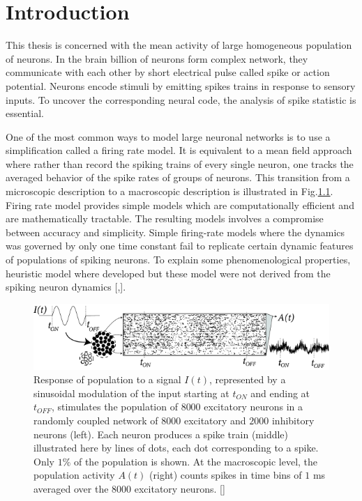\documentclass[12pt,twoside]{report}
\begin{document}
\chapter{Introduction}
\setcounter{page}{1}

\label{sec:intro}


This thesis is concerned with the mean activity of large homogeneous population of neurons. In the brain billion of neurons form complex network, they communicate with each other by short electrical pulse called spike or action potential. Neurons encode stimuli by emitting spikes trains in response to sensory inputs. To uncover the corresponding neural code, the analysis of spike statistic is essential. 


One of the most common ways to model large neuronal networks is to use a simplification called a firing rate model. It is equivalent to a mean field approach where rather than record the spiking trains of every single neuron, one tracks the averaged behavior of the spike rates of groups of neurons. This transition from a microscopic description to a macroscopic description is illustrated in Fig.\ref{fig:x285}. Firing rate model provides simple models which are computationally efficient and are mathematically tractable. The resulting models involves a compromise between accuracy and simplicity. Simple firing-rate models where the dynamics was governed by only one time constant fail to replicate certain dynamic features of populations of spiking neurons. To explain some phenomenological properties, heuristic model where developed but these model were not derived from the spiking neuron dynamics [\cite{WilCow72},\cite{OstBru11}]. 



\begin{figure}[h!]
	\centering
	\includegraphics[width=0.8\linewidth]{x285.png}
	\caption{ Response of population to a signal $I(t)$, represented by a sinusoidal modulation of the input starting at $t_{ON}$ and ending at $t_{OFF}$, stimulates the population of $8 000$ excitatory neurons in a randomly coupled network of $8 000$ excitatory and $2 000$ inhibitory neurons (left). Each neuron produces a spike train (middle) illustrated here by lines of dots, each dot corresponding to a spike. Only $1\%$ of the population is shown. At the macroscopic level, the population activity $A(t)$ (right) counts spikes in time bins of $1$ ms averaged over the $8 000$ excitatory neurons. [\cite{GerKis14}] }
	\label{fig:x285}
\end{figure}
\end{document}
